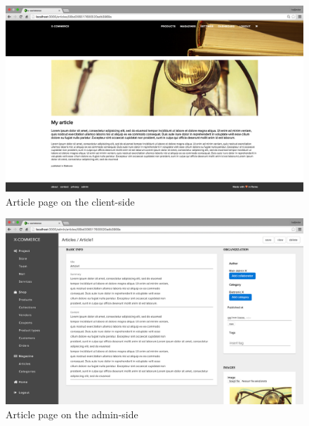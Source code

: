 \begin{figure}[htb]
\centering
\includegraphics[width=1.0\linewidth]{images/chapter4/page-article-cli.png}\hfill
\caption[Article page on the client-side]{Article page on the client-side}
\label{fig:page_article_cli}
\end{figure}
\begin{figure}[htb]
\centering
\includegraphics[width=1.0\linewidth]{images/chapter4/page-article-adm.png}\hfill
\caption[Article page on the admin-side]{Article page on the admin-side}
\label{fig:page_article_admin}
\end{figure}
